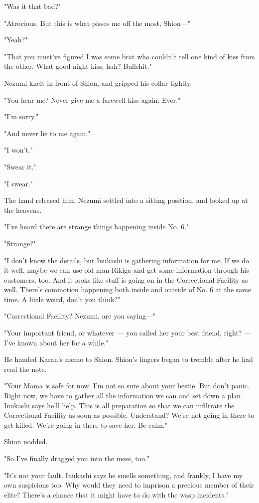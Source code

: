 "Was it that bad?"

"Atrocious. But this is what pisses me off the most, Shion---"

"Yeah?"

"That you must've figured I was some brat who couldn't tell one kind of
kiss from the other. What good-night kiss, huh? Bullshit."

Nezumi knelt in front of Shion, and gripped his collar tightly.

"You hear me? Never give me a farewell kiss again. Ever."

"I'm sorry."

"And never lie to me again."

"I won't."

"Swear it."

"I swear."

The hand released him. Nezumi settled into a sitting position, and
looked up at the heavens.

"I've heard there are strange things happening inside No. 6."

"Strange?"

"I don't know the details, but Inukashi is gathering information for me.
If we do it well, maybe we can use old man Rikiga and get some
information through his customers, too. And it looks like stuff is going
on in the Correctional Facility as well. There's commotion happening
both inside and outside of No. 6 at the same time. A little weird, don't
you think?"

"Correctional Facility? Nezumi, are you saying---"

"Your important friend, or whatever --- you called her your best friend,
right? --- I've known about her for a while."

He handed Karan's memo to Shion. Shion's fingers began to tremble after
he had read the note.

"Your Mama is safe for now. I'm not so sure about your bestie. But don't
panic. Right now, we have to gather all the information we can and set
down a plan. Inukashi says he'll help. This is all preparation so that
we can infiltrate the Correctional Facility as soon as possible.
Understand? We're not going in there to get killed. We're going in there
to save her. Be calm."

Shion nodded.

"So I've finally dragged you into the mess, too."

"It's not your fault. Inukashi says he smells something, and frankly, I
have my own suspicions too. Why would they need to imprison a precious
member of their elite? There's a chance that it might have to do with
the wasp incidents."

